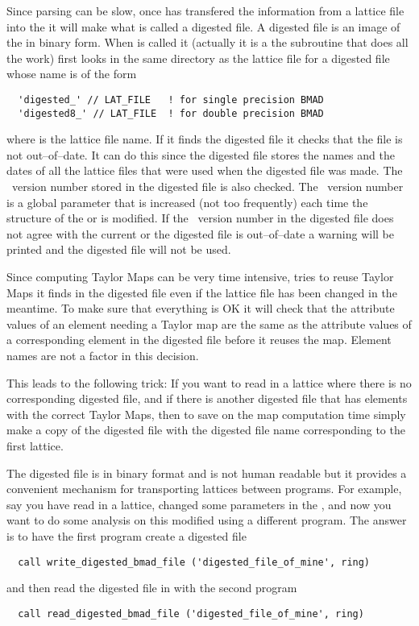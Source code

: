Since parsing can be slow, once  has transfered the
information from a lattice file into the  it will make
what is called a digested file. A digested file is an image of the
 in binary form. When  is called it
(actually it is a the subroutine  that
does all the work) first looks in the same directory as the lattice
file for a digested file whose name is of the form
\begin{verbatim}
  'digested_' // LAT_FILE   ! for single precision BMAD 
  'digested8_' // LAT_FILE  ! for double precision BMAD 
\end{verbatim}
where  is the lattice file name. If it finds the digested
file it checks that the file is not out--of--date. It can do this
since the digested file stores the names and the dates of all the
lattice files that were used when the digested file was made. The
\bmad\ version number stored in the digested file is also checked. The
\bmad\ version number is a global parameter that is increased (not too
frequently) each time the structure of the  or
 is modified. If the \bmad\ version number in the
digested file does not agree with the current or the digested file is
out--of--date a warning will be printed and the digested file will not
be used.

Since computing Taylor Maps can be very time intensive,
 tries to reuse Taylor Maps it finds in the digested
file even if the lattice file has been changed in the meantime. To
make sure that everything is OK it will check that the attribute
values of an element needing a Taylor map are the same as the
attribute values of a corresponding element in the digested file
before it reuses the map. Element names are not a factor in this
decision.

This leads to the following trick: If you want to read in a lattice
where there is no corresponding digested file, and if there is another
digested file that has elements with the correct Taylor Maps, then to
save on the map computation time simply make a copy of the digested
file with the digested file name corresponding to the first lattice.

The digested file is in binary format and is not human readable but it
provides a convenient mechanism for transporting lattices between
programs. For example, say you have read in a lattice, changed
some parameters in the , and now you want to do some
analysis on this modified  using a different program. The 
answer is to have the first program create a digested file
\begin{verbatim}
  call write_digested_bmad_file ('digested_file_of_mine', ring)
\end{verbatim}
and then read the digested file in with the second program
\begin{verbatim}
  call read_digested_bmad_file ('digested_file_of_mine', ring)
\end{verbatim}